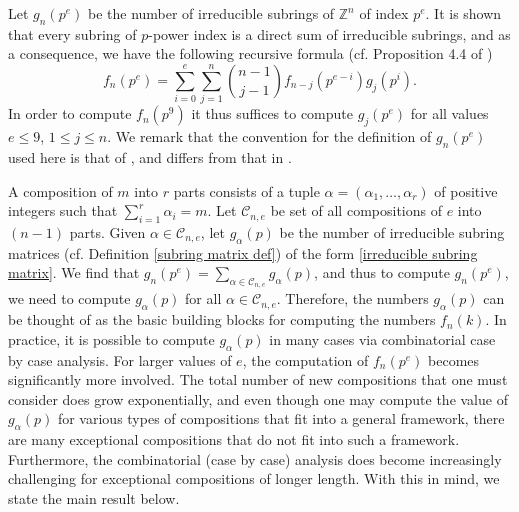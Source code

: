\documentclass[a4paper]{amsart}
\numberwithin{equation}{section}
\theoremstyle{remark}
\newcommand{\Z}{\mathbb{Z}}
\begin{document}
\par Let $g_n(p^e)$ be the number of irreducible subrings of $\Z^n$ of index $p^e$. It is shown that every subring of $p$-power index is a direct sum of irreducible subrings, and as a consequence, we have the following recursive formula (cf. Proposition 4.4 of \cite{liu2007counting})
\begin{equation}\label{recursive formula}
    f_n(p^e)=\sum_{i=0}^e\sum_{j=1}^n {n-1\choose j-1} f_{n-j}(p^{e-i})g_j(p^i).
\end{equation}
 In order to compute $f_n(p^9)$ it thus suffices to compute $g_j(p^e)$ for all values $e\leq 9$, $1\leq j\leq n$. We remark that the convention for the definition of $g_n(p^e)$ used here is that of \cite{atanasov2021counting}, and differs from that in \cite{liu2007counting}.
 \par A composition of $m$ into $r$ parts consists of a tuple $\alpha=(\alpha_1, \dots, \alpha_r)$ of positive integers such that $\sum_{i=1}^r \alpha_i=m$. Let $\mathcal{C}_{n,e}$ be set of all compositions of $e$ into $(n-1)$ parts. Given $\alpha\in \mathcal{C}_{n,e}$, let $g_{\alpha}(p)$ be the number of irreducible subring matrices (cf. Definition \ref{subring matrix def}) of the form
 \eqref{irreducible subring matrix}.
	We find that $g_n(p^e)=\sum_{\alpha\in \mathcal{C}_{n,e}} g_\alpha(p)$, and thus to compute $g_n(p^e)$, we need to compute $g_\alpha(p)$ for all $\alpha\in \mathcal{C}_{n,e}$. Therefore, the numbers $g_\alpha(p)$ can be thought of as the basic building blocks for computing the numbers $f_n(k)$. In practice, it is possible to compute $g_\alpha(p)$ in many cases via combinatorial case by case analysis. For larger values of $e$, the computation of $f_n(p^e)$ becomes significantly more involved. The total number of new compositions that one must consider does grow exponentially, and even though one may compute the value of $g_\alpha(p)$ for various types of compositions that fit into a general framework, there are many exceptional compositions that do not fit into such a framework. Furthermore, the combinatorial (case by case) analysis does become increasingly challenging for exceptional compositions of longer length. With this in mind, we state the main result below.
\end{document}
